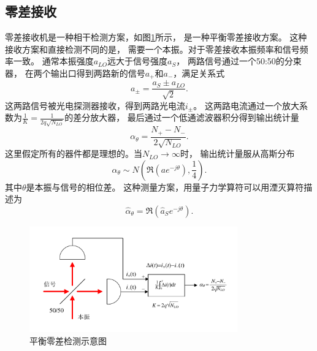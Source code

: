 \subsection{零差接收}
零差接收机是一种相干检测方案，如图\ref{fig:HD}所示，
是一种平衡零差接收方案\cite{gagliardi1976optical,gagliardi1998optical}。
这种接收方案和直接检测不同的是，
需要一个本振。对于零差接收本振频率和信号频率一致。
通常本振强度$a_{LO}$远大于信号强度$a_S$，
两路信号通过一个50:50的分束器，
在两个输出口得到两路新的信号$a_+$和$a_-$，满足关系式
\begin{equation}
a_\pm = \frac{a_S \pm a_{LO}}{\sqrt{2}}.
\end{equation}
这两路信号被光电探测器接收，得到两路光电流$i_\pm$。
这两路电流通过一个放大系数为$\frac{1}{K}=\frac{1}{2q\sqrt{N_{LO}}}$的差分放大器，
最后通过一个低通滤波器积分得到输出统计量
\begin{equation}
\alpha_\theta = \frac{N_+ - N_-}{2\sqrt{N_{LO}}}.
\end{equation}
这里假定所有的器件都是理想的。当$N_{LO} \rightarrow \infty$时，
输出统计量服从高斯分布
\begin{equation}
\alpha_\theta \sim N(\Re(ae^{-j\theta}), \frac{1}{4}).
\label{eq:HD-alpha}
\end{equation}
其中$\theta$是本振与信号的相位差。
这种测量方案，用量子力学算符可以用湮灭算符描述为\cite{yuen1980optical,mandel1995optical}
\begin{equation}
\hat{\alpha}_\theta = \Re(\hat{a}_S e^{-j\theta}).
\end{equation}


\begin{figure}
\centering
  \includegraphics[width=0.8\textwidth]{figures/chap2/homodyne-receiver.pdf}
  \caption{平衡零差检测示意图}
  \label{fig:HD}
\end{figure}

